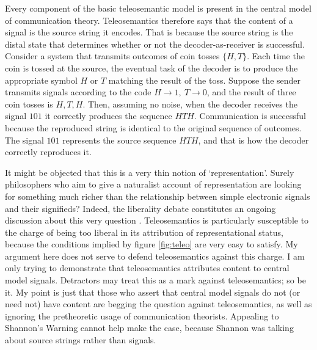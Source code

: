 Every component of the basic teleosemantic model is present in the central model of communication theory.
Teleosemantics therefore says that the content of a signal is the source string it encodes.
That is because the source string is the distal state that determines whether or not the decoder-as-receiver is successful.
Consider a system that transmits outcomes of coin tosses $\{H,T\}$.
Each time the coin is tossed at the source, the eventual task of the decoder is to produce the appropriate symbol $H$ or $T$ matching the result of the toss.
Suppose the sender transmits signals according to the code $H\rightarrow1,\ T\rightarrow0$, and the result of three coin tosses is $H, T, H$.
Then, assuming no noise, when the decoder receives the signal $101$ it correctly produces the sequence $HTH$.
Communication is successful because the reproduced string is identical to the original sequence of outcomes.
The signal $101$ represents the source sequence $HTH$, and that is how the decoder correctly reproduces it.

It might be objected that this is a very thin notion of `representation'.
Surely philosophers who aim to give a naturalist account of representation are looking for something much richer than the relationship between simple electronic signals and their signifieds?
Indeed, the liberality debate constitutes an ongoing discussion about this very question \citep{artiga2016liberal,desouzafilho2022dual}.
Teleosemantics is particularly susceptible to the charge of being too liberal in its attribution of representational status, because the conditions implied by figure \ref{fig:teleo} are very easy to satisfy.
My argument here does not serve to defend teleosemantics against this charge.
I am only trying to demonstrate that teleosemantics attributes content to central model signals.
Detractors may treat this as a mark against teleosemantics; so be it.
My point is just that those who assert that central model signals do not (or need not) have content are begging the question against teleosemantics, as well as ignoring the pretheoretic usage of communication theorists.
Appealing to {\sc Shannon's Warning} cannot help make the case, because Shannon was talking about source strings rather than signals.


